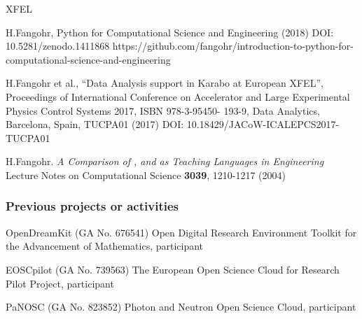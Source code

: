 \begin{sitedescription}{XFEL}
\begin{compactenum}
\item H.Fangohr, Python for Computational Science and Engineering
  (2018) DOI: 10.5281/zenodo.1411868 \newline
  https://github.com/fangohr/introduction-to-python-for-computational-science-and-engineering
\item H.Fangohr et al., “Data Analysis support in Karabo at European
  XFEL”, Proceedings of International Conference on Accelerator and
  Large Experimental Physics Control Systems 2017, ISBN 978-3-95450-
  193-9, Data Analytics, Barcelona, Spain, TUCPA01 (2017) DOI: 10.18429/JACoW-ICALEPCS2017-TUCPA01
\item H.Fangohr.
\emph{A Comparison of , \Matlab and \Python as Teaching Languages in Engineering}
Lecture Notes on Computational Science \textbf{3039}, 1210-1217 (2004)
\end{compactenum}

\subsubsection*{Previous projects or activities}

\begin{compactenum}
\item OpenDreamKit (GA No. 676541) Open Digital Research Environment
  Toolkit for the Advancement of Mathematics, participant
\item EOSCpilot (GA No. 739563) The European Open Science Cloud for
  Research Pilot Project, participant
\item PaNOSC (GA No. 823852) Photon and Neutron Open Science Cloud, participant
\end{compactenum}

\end{sitedescription}







